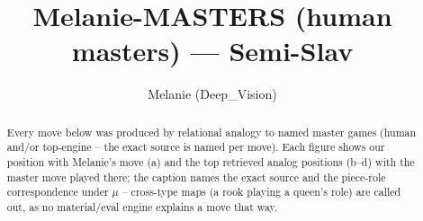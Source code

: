 \documentclass[11pt]{article}
\title{Melanie-MASTERS (human masters) — Semi-Slav}
\author{Melanie (Deep\_Vision)}
\date{}
\begin{document}
\maketitle

\begin{abstract}Every move below was produced by relational analogy to named master games (human and/or top-engine -- the exact source is named per move). Each figure shows our position with Melanie's move (a) and the top retrieved analog positions (b--d) with the master move played there; the caption names the exact source and the piece-role correspondence under $\mu$ -- cross-type maps (a rook playing a queen's role) are called out, as no material/eval engine explains a move that way.\end{abstract}

\begin{figure}[p]\centering
\begin{subfigure}{0.46\textwidth}\centering
\resizebox{\linewidth}{!}{%
\newchessgame
\chessboard[
  setfen={r1bqkb1r/pp1n1ppp/2p1pn2/8/2BP4/2N1PN2/PP3PPP/R1BQK2R b KQkq - 0 7},
  showmover=false,
  pgfstyle=straightmove, color=movearrow, markmove={d7-b6}
]}
\caption{}
\end{subfigure}\hfill
\begin{subfigure}{0.46\textwidth}\centering
\resizebox{\linewidth}{!}{%
\newchessgame
\chessboard[
  setfen={r3k2r/pbp2ppp/1pnbq3/3np3/8/PP1PP3/1B1NBPPP/RN1QK2R w KQkq - 1 11},
  showmover=false,
  pgfstyle=straightmove, color=movearrow, markmove={e2-f3}
]}
\caption{}
\end{subfigure}
\\[4pt]
\begin{subfigure}{0.46\textwidth}\centering
\resizebox{\linewidth}{!}{%
\newchessgame
\chessboard[
  setfen={r1bqkb1r/pp4pp/2n2p2/3np3/8/1P2PN2/PB1N1PPP/R2QKB1R w KQkq - 0 11},
  showmover=false,
  pgfstyle=straightmove, color=movearrow, markmove={f1-c4}
]}
\caption{}
\end{subfigure}\hfill
\begin{subfigure}{0.46\textwidth}\centering
\resizebox{\linewidth}{!}{%
\newchessgame
\chessboard[
  setfen={r2qkb1r/pppbnppp/6n1/3Pp3/4P2P/PQN2N2/1P3PP1/R1B1KB1R b KQkq - 0 11},
  showmover=false,
  pgfstyle=straightmove, color=movearrow, markmove={h7-h5}
]}
\caption{}
\end{subfigure}

\end{figure}
\end{document}
